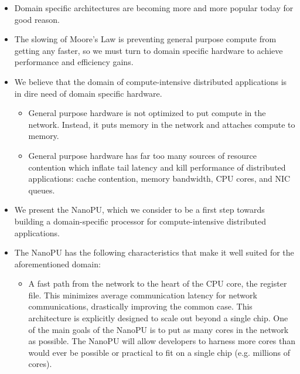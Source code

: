 \begin{itemize}
    \item Domain specific architectures are becoming more and more popular today for good reason.
    \item The slowing of Moore's Law is preventing general purpose compute from getting any faster, so we must turn to domain specific hardware to achieve performance and efficiency gains.
    \item We believe that the domain of compute-intensive distributed applications is in dire need of domain specific hardware.
    \begin{itemize}
        \item General purpose hardware is not optimized to put compute in the network. Instead, it puts memory in the network and attaches compute to memory. 
        \item General purpose hardware has far too many sources of resource contention which inflate tail latency and kill performance of distributed applications: cache contention, memory bandwidth, CPU cores, and NIC queues. 
    \end{itemize}
    \item We present the NanoPU, which we consider to be a first step towards building a domain-specific processor for compute-intensive distributed applications.
    \item The NanoPU has the following characteristics that make it well suited for the aforementioned domain:
    \begin{itemize}
        \item A fast path from the network to the heart of the CPU core, the register file. This minimizes average communication latency for network communications, drastically improving the common case. This architecture is explicitly designed to scale out beyond a single chip. One of the main goals of the NanoPU is to put as many cores in the network as possible. The NanoPU will allow developers to harness more cores than would ever be possible or practical to fit on a single chip (e.g. millions of cores).

\end{itemize}
\end{itemize}
